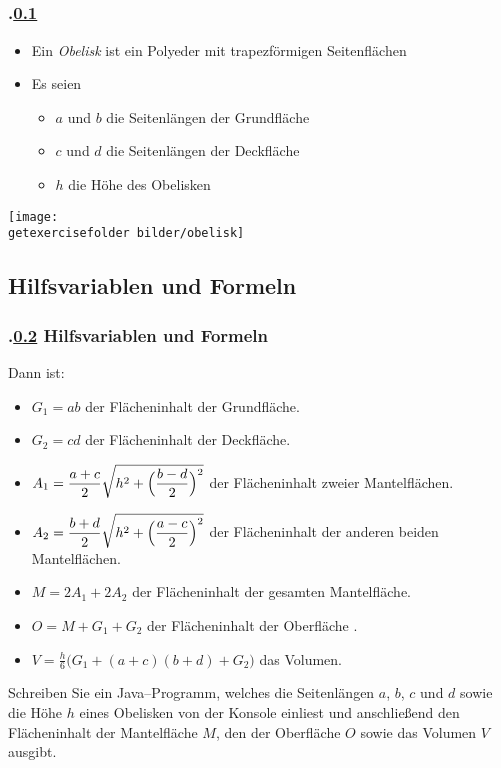 \subsection{\stitle}\label{S:Beispiel Obelisk}
\begin{frame}[t]%
    \frametitle{\kap.\ref{S:Beispiel Obelisk} \stitle}%

\begin{itemize}
 \item Ein \emph{Obelisk} ist ein Polyeder mit trapezf\"ormigen Seitenfl\"achen
 \item Es seien
 \begin{itemize}
  \item $a$ und $b$ die Seitenl\"angen der Grundfl\"ache
  \item $c$ und $d$ die Seitenl\"angen der Deckfl\"ache
  \item $h$ die H\"ohe des Obelisken
 \end{itemize}
\end{itemize}

\begin{center}
\texttt{[image: \\getexercisefolder bilder/obelisk]}
\end{center}
\end{frame}


\def\stitle{Hilfsvariablen und Formeln}%
\subsection{\stitle}\label{S:Formeln}
\begin{frame}[t]%
    \frametitle{\kap.\ref{S:Formeln} \stitle}%

Dann ist:
\begin{itemize}
\item $G_1 = ab$ der Fl\"acheninhalt der Grundfl\"ache.
\item $G_2 = cd$ der Fl\"acheninhalt der Deckfl\"ache.
\item $\displaystyle A_1 = \frac{a+c}{2} \sqrt{h^2 + \Bigl(\frac{b-d}{2}\Bigr)^2}$
der Fl\"acheninhalt zweier Mantelfl\"achen.
\item $\displaystyle A_2 = \frac{b+d}{2} \sqrt{h^2 + \Bigl(\frac{a-c}{2}\Bigr)^2}$
der Fl\"acheninhalt der anderen beiden Mantelfl\"achen.
\item $M = 2 A_1 + 2 A_2$ der Fl\"acheninhalt der gesamten Mantelfl\"ache.
\item $O = M + G_1 + G_2$ der Fl\"acheninhalt der Oberfl\"ache .
\item $\displaystyle V = \frac{h}{6}\bigl(G_1 + (a+c)(b+d) + G_2\bigr)$ das Volumen.
\end{itemize}
\medskip

Schreiben Sie ein Java--Programm, welches die Seitenl\"angen $a$, $b$, $c$ und $d$ sowie die H\"ohe $h$ eines Obelisken von der Konsole einliest und anschlie\ss end den Fl\"acheninhalt der Mantelfl\"ache $M$, den der Oberfl\"ache $O$ sowie das Volumen $V$ ausgibt.

\end{frame}


